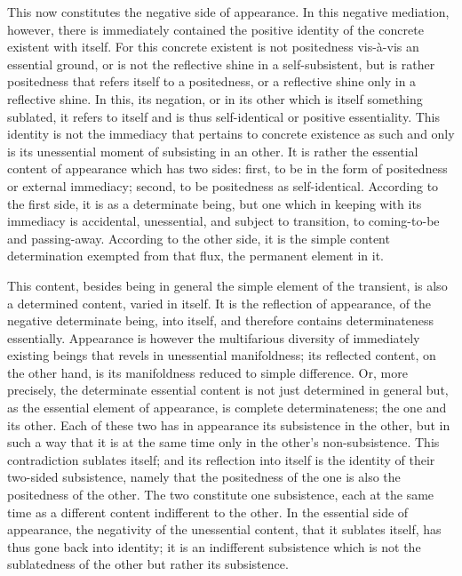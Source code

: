 This now constitutes the negative side of appearance.
In this negative mediation, however,
there is immediately contained the positive identity of
the concrete existent with itself.
For this concrete existent is not positedness
vis-à-vis an essential ground,
or is not the reflective shine in a self-subsistent,
but is rather positedness that refers itself to a positedness,
or a reflective shine only in a reflective shine.
In this, its negation, or in its other which is itself something sublated,
it refers to itself and is thus self-identical or positive essentiality.
This identity is not the immediacy that pertains to concrete existence
as such and only is its unessential moment of subsisting in an other.
It is rather the essential content of appearance which has two sides:
first, to be in the form of positedness or external immediacy;
second, to be positedness as self-identical.
According to the first side, it is as a determinate being,
but one which in keeping with its immediacy is accidental, unessential,
and subject to transition, to coming-to-be and passing-away.
According to the other side, it is the simple content determination
exempted from that flux, the permanent element in it.

This content, besides being in general the simple element of the transient,
is also a determined content, varied in itself.
It is the reflection of appearance, of the negative determinate being,
into itself, and therefore contains determinateness essentially.
Appearance is however the multifarious diversity
of immediately existing beings that revels in unessential manifoldness;
its reflected content, on the other hand,
is its manifoldness reduced to simple difference.
Or, more precisely, the determinate essential content is not
just determined in general but, as the essential element of appearance,
is complete determinateness; the one and its other.
Each of these two has in appearance its subsistence in the other,
but in such a way that it is at the same time
only in the other's non-subsistence.
This contradiction sublates itself;
and its reflection into itself is
the identity of their two-sided subsistence,
namely that the positedness of the one is
also the positedness of the other.
The two constitute one subsistence,
each at the same time as a different content
indifferent to the other.
In the essential side of appearance,
the negativity of the unessential content,
that it sublates itself, has thus gone back into identity;
it is an indifferent subsistence which is not
the sublatedness of the other but rather its subsistence.

